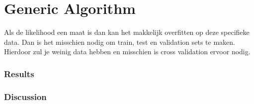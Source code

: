 \documentclass[11pt,a4paper]{report}
\begin{document}
\part{Generic Algorithm}
Als de likelihood een maat is dan kan het makkelijk overfitten op deze specifieke data. Dan is het misschien nodig om train, test en validation sets te maken. Hierdoor zul je weinig data hebben en misschien is cross validation ervoor nodig.

\section{Results}


\section{Discussion}
\end{document}
